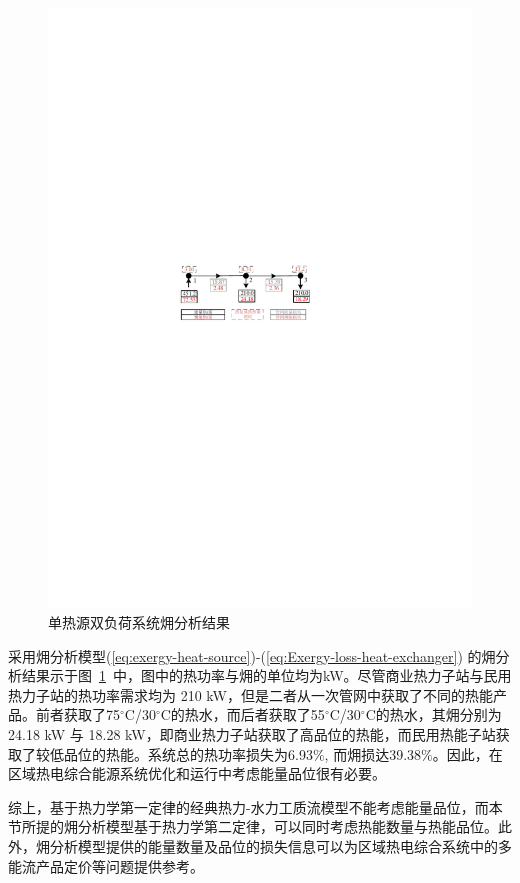 \begin{figure}[!htp]
\centering
\includegraphics[scale=1.35]{figures/Chap4-6-DHN-Exergy-Case.pdf}
\caption{单热源双负荷系统㶲分析结果}
\label{Fig:DHN-Exergy-Case}
\end{figure}

采用㶲分析模型(\ref{eq:exergy-heat-source})-(\ref{eq:Exergy-loss-heat-exchanger}) 的㶲分析结果示于图~\ref{Fig:DHN-Exergy-Case}~中，图中的热功率与㶲的单位均为kW。尽管商业热力子站与民用热力子站的热功率需求均为 210 kW，但是二者从一次管网中获取了不同的热能产品。前者获取了75$^\circ$C/30$^\circ$C的热水，而后者获取了55$^\circ$C/30$^\circ$C的热水，其㶲分别为24.18 kW 与 18.28 kW，即商业热力子站获取了高品位的热能，而民用热能子站获取了较低品位的热能。系统总的热功率损失为6.93$\%$, 而㶲损达39.38$\%$。因此，在区域热电综合能源系统优化和运行中考虑能量品位很有必要。

综上，基于热力学第一定律的经典热力-水力工质流模型不能考虑能量品位，而本节所提的㶲分析模型基于热力学第二定律，可以同时考虑热能数量与热能品位。此外，㶲分析模型提供的能量数量及品位的损失信息可以为区域热电综合系统中的多能流产品定价等问题提供参考。

